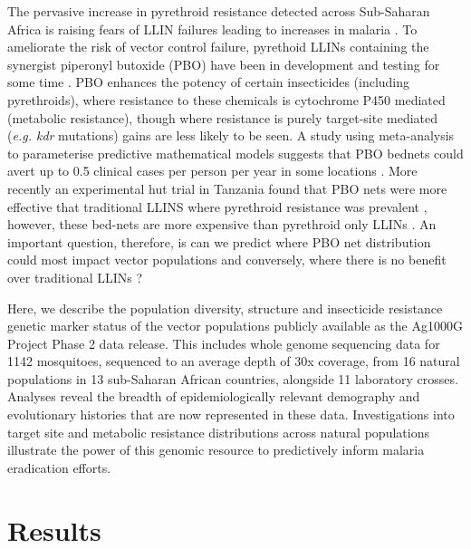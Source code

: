 \documentclass[a4paper,11pt,abstracton,hidelinks]{scrartcl}
\begin{document}
The pervasive increase in pyrethroid resistance detected across Sub-Saharan Africa is raising fears of LLIN failures leading to increases in malaria \cite{churcher2016, Hemingway2016}.
%
To ameliorate the risk of vector control failure, pyrethoid LLINs containing the synergist piperonyl butoxide (PBO) have been in development and testing for some time \cite{darriet2011, protopopoff2018}.
%
PBO enhances the potency of certain insecticides (including pyrethroids), where resistance to these chemicals is cytochrome P450 mediated (metabolic resistance), though where resistance is purely target-site mediated (\textit{e.g. kdr} mutations) gains are less likely to be seen.
%
A study using  meta-analysis to parameterise predictive mathematical models suggests that PBO bednets could avert up to 0.5 clinical cases per person per year in some locations \cite{churcher2016}.
%
More recently an experimental hut trial in Tanzania found that PBO nets were more effective that traditional LLINS where pyrethroid resistance was prevalent \cite{protopopoff2018}, however, these bed-nets are more expensive than pyrethroid only LLINs \cite{churcher2016}.
%
An important question, therefore, is can we predict where PBO net distribution could most impact vector populations and conversely, where there is no benefit over traditional LLINs \cite{protopopoff2018, toe2018}?


Here, we describe the population diversity, structure and insecticide resistance genetic marker status of the vector populations publicly available as the Ag1000G Project Phase 2 data release.
%
This includes whole genome sequencing data for 1142 mosquitoes, sequenced to an average depth of 30x coverage, from 16 natural populations in 13 sub-Saharan African countries, alongside 11 laboratory crosses.
%
Analyses reveal the breadth of epidemiologically relevant demography and evolutionary histories that are now represented in these data.
%
Investigations into target site and metabolic resistance distributions across natural populations illustrate the power of this genomic resource to predictively inform malaria eradication efforts.



\section*{Results}
\end{document}
